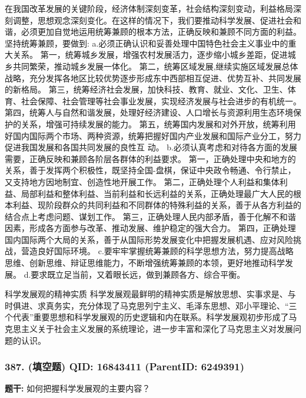 \documentclass[12pt,UTF8]{ctexart}
\begin{document}
在我国改革发展的关键阶段，经济体制深刻变革，社会结构深刻变动，利益格局深刻调整，思想观念深刻变化。在这样的情况下，我们要推动科学发展、促进社会和谐，必须更加自觉地运用统筹兼顾的根本方法，正确反映和兼顾不同方面的利益。坚持统筹兼顾，要做到:
a.必须正确认识和妥善处理中国特色社会主义事业中的重大关系。
第一，统筹城乡发展，增强农村发展活力，逐步缩小城乡差距，促进城乡共同繁荣，推动城乡发展一体化。
第二，统筹区域发展,继续实施区域发展总体战略，充分发挥各地区比较优势逐步形成东中西部相互促进、优势互补、共同发展的新格局。
第三，统筹经济社会发展，加快科技、教育、就业、文化、卫生、体育、社会保障、社会管理等社会事业发展，实现经济发展与社会进步的有机统一。
第四，统筹人与自然和谐发展，处理好经济建设、人口增长与资源利用生态环境保护的关系，增强可持续发展的能力。
第五，统筹国内发展和对外开放，统筹利用好国内国际两个市场、两种资源，统筹把握好国内产业发展和国际产业分工，努力促进我国发展和各国共同发展的良性互
动。
b.必须认真考虑和对待各方面的发展需要，正确反映和兼顾各阶层各群体的利益要求。
第一，正确处理中央和地方的关系，善于发挥两个积极性，既坚持全国-盘棋，保证中央政令畅通、令行禁止，又支持地方因地制宜、创造性地开展工作。
第二，正确处理个人利益和集体利益、局部利益和整体利益、当前利益和长远利益的关系，正确处理最广大人民的根本利益、现阶段群众的共同利益和不同群体的特殊利益的关系，善于从各方利益的结合点上考虑问题、谋划工作。
第三，正确处理人民内部矛盾，善于化解不和谐因素，形成各方面参与改革、推动发展、维护稳定的强大合力。
第四，正确处理国内国际两个大局的关系，善于从国际形势发展变化中把握发展机遇、应对风险挑战，营造良好国际环境。
c.要牢牢掌握统筹兼顾的科学思想方法，努力提高战略思维、创新思维、辩证思维能力，不断增强统筹兼顾的本领，更好地推动科学发展。
d.要求既立足当前，又着眼长远，做到兼顾各方、综合平衡。

科学发展观的精神实质
科学发展观最鲜明的精神实质是解放思想、实事求是、与时俱进、求真务实，充分体现了马克思列宁主义、毛泽东思想、邓小平理论、“三个代表”重要思想和科学发展观的历史逻辑和内在联系。科学发展观初步形成了马克思主义关于社会主义发展的系统理论，进一步丰富和深化了马克思主义对发展问题的认识。

\vspace{0.3em}\hrulefill\vspace{0.7em}

\subsubsection*{387. (填空题) \small QID: 16843411 (ParentID: 6249391)}

\textbf{题干:}
如何把握科学发展观的主要内容？
\end{document}
